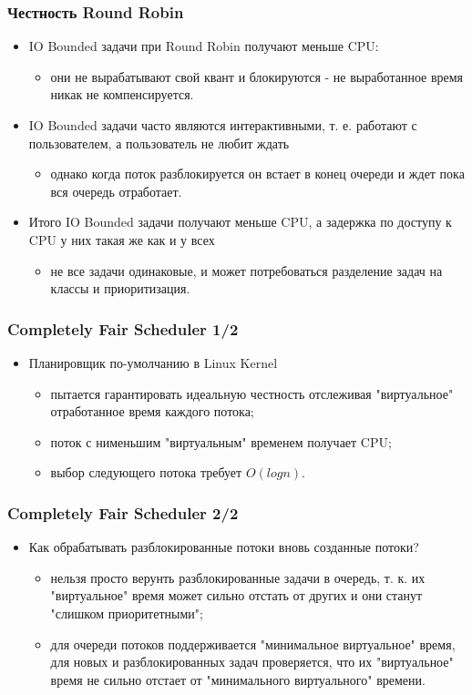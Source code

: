 \begin{frame}
\frametitle{Честность Round Robin}
\begin{itemize}
  \item IO Bounded задачи при Round Robin получают меньше CPU:
  \begin{itemize}
    \item они не вырабатывают свой квант и блокируются - не выработанное время
    никак не компенсируется.
  \end{itemize}
  \item IO Bounded задачи часто являются интерактивными, т. е. работают с
  пользователем, а пользователь не любит ждать
  \begin{itemize}
    \item однако когда поток разблокируется он встает в конец очереди и ждет
    пока вся очередь отработает.
  \end{itemize}
  \item Итого IO Bounded задачи получают меньше CPU, а задержка по доступу к CPU
  у них такая же как и у всех
  \begin{itemize}
    \item не все задачи одинаковые, и может потребоваться разделение задач на
    классы и приоритизация.
  \end{itemize}
\end{itemize}
\end{frame}

\begin{frame}
\frametitle{Completely Fair Scheduler 1/2}
\begin{itemize}
  \item Планировщик по-умолчанию в Linux Kernel
  \begin{itemize}
    \item пытается гарантировать идеальную честность отслеживая "виртуальное"
    отработанное время каждого потока;
    \item поток с нименьшим "виртуальным" временем получает CPU;
    \item выбор следующего потока требует $O\left(log n\right)$.
  \end{itemize}
\end{itemize}
\end{frame}

\begin{frame}
\frametitle{Completely Fair Scheduler 2/2}
\begin{itemize}
  \item Как обрабатывать разблокированные потоки вновь созданные потоки?
  \begin{itemize}
    \item нельзя просто верунть разблокированные задачи в очередь, т. к. их
    "виртуальное" время может сильно отстать от других и они станут "слишком
    приоритетными";
    \item для очереди потоков поддерживается "минимальное виртуальное" время,
    для новых и разблокированных задач проверяется, что их "виртуальное" время
    не сильно отстает от "минимального виртуального" времени.
  \end{itemize}
\end{itemize}
\end{frame}

